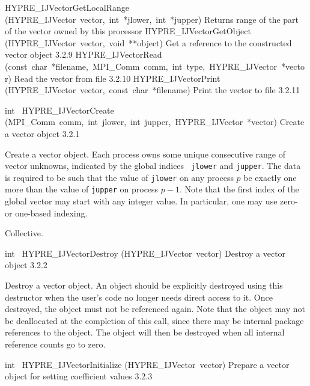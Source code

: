 \documentclass{article}
\begin{document}
\begin{cxxentry}
\begin{cxxentry}
\begin{cxxnames}
        {HYPRE\_IJVectorGetLocalRange}
        {(HYPRE\_IJVector\ vector,\ int\ *jlower,\ int\ *jupper)}
        {
Returns range of the part of the vector owned by this processor}
        {}
\label{cxx.3.2.15}
        {HYPRE\_IJVectorGetObject}
        {(HYPRE\_IJVector\ vector,\ void\ **object)}
        {
Get a reference to the constructed vector object}
        {3.2.9}
        {HYPRE\_IJVectorRead}
        {(const\ char\ *filename,\ MPI\_Comm\ comm,\ int\ type,\ HYPRE\_IJVector\ *vector)}
        {
Read the vector from file}
        {3.2.10}
        {HYPRE\_IJVectorPrint}
        {(HYPRE\_IJVector\ vector,\ const\ char\ *filename)}
        {
Print the vector to file}
        {3.2.11}
\end{cxxnames}
\begin{cxxfunction}
{int\ }
        {HYPRE\_IJVectorCreate}
        {(MPI\_Comm\ comm,\ int\ jlower,\ int\ jupper,\ HYPRE\_IJVector\ *vector)}
        {
Create a vector object}
        {3.2.1}
\begin{cxxdoc}

Create a vector object.  Each process owns some unique consecutive
range of vector unknowns, indicated by the global indices {\tt
jlower} and {\tt jupper}.  The data is required to be such that the
value of {\tt jlower} on any process $p$ be exactly one more than
the value of {\tt jupper} on process $p-1$.  Note that the first
index of the global vector may start with any integer value.  In
particular, one may use zero- or one-based indexing.

Collective.
\end{cxxdoc}
\end{cxxfunction}
\begin{cxxfunction}
{int\ }
        {HYPRE\_IJVectorDestroy}
        {(HYPRE\_IJVector\ vector)}
        {
Destroy a vector object}
        {3.2.2}
\begin{cxxdoc}

Destroy a vector object.  An object should be explicitly destroyed
using this destructor when the user's code no longer needs direct
access to it.  Once destroyed, the object must not be referenced
again.  Note that the object may not be deallocated at the
completion of this call, since there may be internal package
references to the object.  The object will then be destroyed when
all internal reference counts go to zero.
\end{cxxdoc}
\end{cxxfunction}
\begin{cxxfunction}
{int\ }
        {HYPRE\_IJVectorInitialize}
        {(HYPRE\_IJVector\ vector)}
        {
Prepare a vector object for setting coefficient values}
        {3.2.3}
\begin{cxxdoc}


\end{cxxdoc}
\end{cxxfunction}
\end{cxxentry}
\end{cxxentry}
\end{document}
